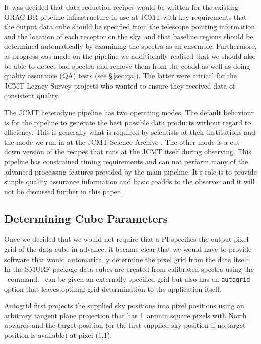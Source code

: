 \documentclass[final,authoryear,5p,times,twocolumn]{elsarticle}
\begin{document}
It was decided that data reduction recipes would be written for the
existing ORAC-DR pipeline infrastructure in use at JCMT
\citep{2011tfa..confE..42J,2008AN....329..295C} with key requirements
that the output data cube should be specified from the telescope
pointing information and the location of each receptor on the sky, and
that baseline regions should be determined automatically by examining
the spectra as an ensemble. Furthermore, as progress was made on the
pipeline we additionally realised that we should also be able to
detect bad spectra and remove them from the coadd as well as doing
quality assurance (QA) tests (see \S\,\ref{sec:qa}). The latter were
critical for the JCMT Legacy Survey projects
\citep{2007PASP..119..855W,2009ApJ...693.1736W,2007PASP..119..102P}
who wanted to ensure they received data of consistent quality.

The JCMT heterodyne pipeline has two operating modes. The default
behaviour is for the pipeline to generate the best possible data
products without regard to efficiency. This is generally what is
required by scientists at their institutions and the mode we run in at
the JCMT Science Archive
\citep{2008ASPC..394..135G,2008ASPC..394..565J}. The other mode is a
cut-down version of the recipes that runs at the JCMT itself during
observing. This pipeline has constrained timing requirements and can
not perform many of the advanced processing features provided by the
main pipeline. It's role is to provide simple quality assurance
information and basic coadds to the observer and it will not be
discussed further in this paper.

\subsection{Determining Cube Parameters}
\label{sec:makecube}

Once we decided that we would not require that a PI specifies the
output pixel grid of the data cube in advance, it became clear that we
would have to provide software that would automatically determine the
pixel grid from the data itself. In the SMURF package data cubes are
created from calibrated spectra using the \makecube\
command. \makecube\ can be given an externally specified grid but also
has an \texttt{autogrid} option that leaves optimal grid determination
to the application itself.

Autogrid first projects the supplied sky positions into pixel
positions using an arbitrary tangent plane projection that has
1~arcmin square pixels with North upwards and the target position
(or the first supplied sky position if no target position is
available) at pixel (1,1).
\end{document}
